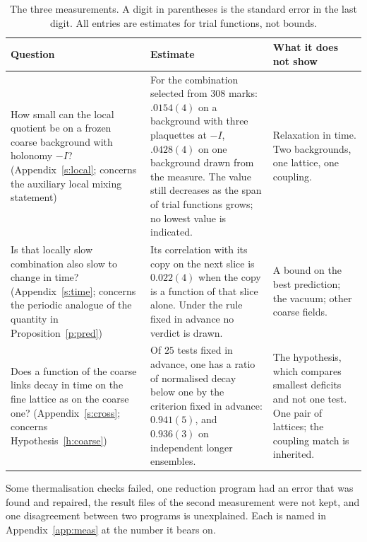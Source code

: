 \begin{table}[htbp]
\caption{The three measurements. A digit in parentheses is the standard error in the last digit. All
entries are estimates for trial functions, not bounds.}\label{tab:meas}
\centering\small
\begin{tabular}{@{}>{\raggedright\arraybackslash}p{}>{\raggedright\arraybackslash}p{}>{\raggedright\arraybackslash}p{}@{}}
\toprule
Question & Estimate & What it does not show \\
\midrule
How small can the local quotient be on a frozen coarse background with holonomy $-I$?
(Appendix~\ref{s:local}; concerns the auxiliary local mixing statement) &
For the combination selected from $308$ marks: $.0154(4)$ on a background with three plaquettes at $-I$,
$.0428(4)$ on one background drawn from the measure. The value still decreases as the span of trial
functions grows; no lowest value is indicated. &
Relaxation in time. Two backgrounds, one lattice, one coupling. \\
\addlinespace
Is that locally slow combination also slow to change in time? (Appendix~\ref{s:time}; concerns the periodic
analogue of the quantity in Proposition~\ref{p:pred}) &
Its correlation with its copy on the next slice is $0.022(4)$ when the copy is a function of that slice
alone. Under the rule fixed in advance no verdict is drawn. &
A bound on the best prediction; the vacuum; other coarse fields. \\
\addlinespace
Does a function of the coarse links decay in time on the fine lattice as on the coarse one?
(Appendix~\ref{s:cross}; concerns Hypothesis~\ref{h:coarse}) &
Of $25$ tests fixed in advance, one has a ratio of normalised decay below one by the criterion fixed in
advance: $0.941(5)$, and $0.936(3)$ on independent longer ensembles. &
The hypothesis, which compares smallest deficits and not one test. One pair of lattices; the coupling match
is inherited. \\
\bottomrule
\end{tabular}
\end{table}

Some thermalisation checks failed, one reduction program had an error that was found and repaired, the
result files of the second measurement were not kept, and one disagreement between two programs is
unexplained. Each is named in Appendix~\ref{app:meas} at the number it bears on.

